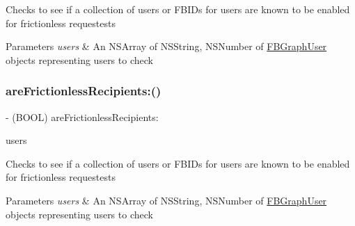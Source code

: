 Checks to see if a collection of users or F\+B\+I\+Ds for users are known to be enabled for frictionless requestests


\begin{DoxyParams}{Parameters}
{\em users} & An N\+S\+Array of N\+S\+String, N\+S\+Number of {\ttfamily \hyperlink{protocolFBGraphUser-p}{F\+B\+Graph\+User}} objects representing users to check \\
\hline
\end{DoxyParams}
\mbox{\label{interfaceFBFrictionlessRecipientCache_a8a6dcc263fb784a4a00fcd37a6a47ca6}} 
\subsubsection{\texorpdfstring{are\+Frictionless\+Recipients\+:()}{areFrictionlessRecipients:()}\hspace{0.1cm}{\footnotesize\ttfamily [3/5]}}
{\footnotesize\ttfamily -\/ (B\+O\+OL) are\+Frictionless\+Recipients\+: \begin{DoxyParamCaption}\item[{(N\+S\+Array $\ast$)}]{users }\end{DoxyParamCaption}}

Checks to see if a collection of users or F\+B\+I\+Ds for users are known to be enabled for frictionless requestests


\begin{DoxyParams}{Parameters}
{\em users} & An N\+S\+Array of N\+S\+String, N\+S\+Number of {\ttfamily \hyperlink{protocolFBGraphUser-p}{F\+B\+Graph\+User}} objects representing users to check \\
\hline
\end{DoxyParams}
\mbox{\label{interfaceFBFrictionlessRecipientCache_a8a6dcc263fb784a4a00fcd37a6a47ca6}} 
